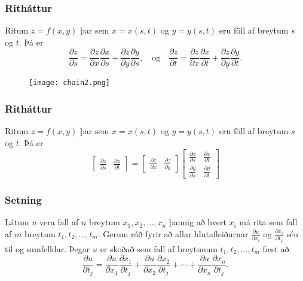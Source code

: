 \subsubsection{Ritháttur }

Ritum $z=f(x,y)$ þar sem $x=x(s,t)$ og $y=y(s,t)$ eru föll af breytum $s$ og  $t$.  Þá er 
$$\frac{\partial z}{\partial s}=
\frac{\partial z}{\partial x}\frac{\partial x}{\partial s}
+\frac{\partial z}{\partial y}\frac{\partial y}{\partial s}, \quad \text{og}\quad \frac{\partial z}{\partial t}=
\frac{\partial z}{\partial x}\frac{\partial x}{\partial t}
+\frac{\partial z}{\partial y}\frac{\partial y}{\partial t}.$$

 \begin{figure}[h!]
           \centering
            \texttt{[image: chain2.png]}
	\caption*{}
    \end{figure}


\subsubsection{Ritháttur}
 Ritum $z=f(x,y)$ þar sem $x=x(s,t)$ og $y=y(s,t)$ eru föll af breytum $s$ og  $t$.  Þá er 
$$\begin{bmatrix}\frac{\partial z}{\partial s} 
& \frac{\partial z}{\partial t}\end{bmatrix}
=\begin{bmatrix}\frac{\partial z}{\partial x} 
& \frac{\partial z}{\partial y}\end{bmatrix}
\begin{bmatrix}\frac{\partial x}{\partial s} 
& \frac{\partial x}{\partial t}\\
\frac{\partial y}{\partial s} 
& \frac{\partial y}{\partial t}
\end{bmatrix}$$

 

\subsubsection{Setning }
Látum $u$ vera fall af $n$ breytum $x_1, x_2, \ldots, x_n$ þannig að hvert $x_i$ má rita sem fall af $m$ breytum $t_1, t_2, \ldots, t_m$.  Gerum ráð fyrir að allar hlutafleiðurnar $\frac{\partial u}{\partial x_i}$ og $\frac{\partial x_i}{\partial t_j}$ séu til og samfelldar.  Þegar $u$ er skoðað sem fall af breytunum $t_1, t_2, \ldots, t_m$ fæst að 
$$\frac{\partial u}{\partial t_j}=
\frac{\partial u}{\partial x_1}\frac{\partial x_1}{\partial t_j}
+\frac{\partial u}{\partial x_2}\frac{\partial x_2}{\partial t_j}
+\cdots+
\frac{\partial u}{\partial x_n}\frac{\partial x_n}{\partial t_j}.$$

